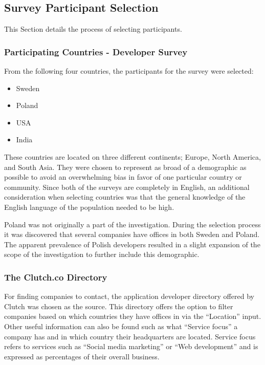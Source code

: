 \documentclass[a4paper,12pt]{article}
\begin{document}
\newpage
\subsection{Survey Participant Selection}
\label{Project_participantSelection}
This Section details the process of selecting participants.

\subsubsection{Participating Countries - Developer Survey}
\label{Project_participantSelection_countries}
From the following four countries, the participants for the survey were selected:
\begin{itemize}
    \item Sweden
    \item Poland
    \item USA
    \item India
\end{itemize}

These countries are located on three different continents; Europe, North America, and South Asia. They were chosen to represent as broad of a demographic as possible to avoid an overwhelming bias in favor of one particular country or community. Since both of the surveys are completely in English, an additional consideration when selecting countries was that the general knowledge of the English language of the population needed to be high.

Poland was not originally a part of the investigation. During the selection process it was discovered that several companies have offices in both Sweden and Poland. The apparent prevalence of Polish developers resulted in a slight expansion of the scope of the investigation to further include this demographic.

\subsubsection{The Clutch.co Directory}
\label{Project_participantSelection_clutch}
For finding companies to contact, the application developer directory offered by Clutch \cite{clutch} was chosen as the source. This directory offers the option to filter companies based on which countries they have offices in via the “Location” input. Other useful information can also be found such as what “Service focus” a company has and in which country their headquarters are located. Service focus refers to services such as “Social media marketing” or “Web development” and is expressed as percentages of their overall business.
\end{document}
